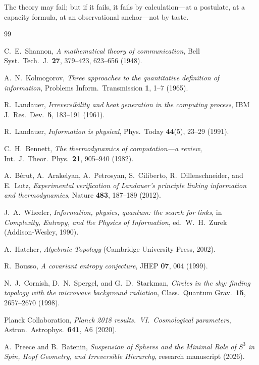 \documentclass[11pt,a4paper]{article}
\theoremstyle{definition}
\theoremstyle{remark}
\newcommand{\Sthree}{S^{3}}
\begin{document}
The theory may fail; but if it fails, it fails by calculation---at a postulate, at a capacity
formula, at an observational anchor---not by taste.

\begin{thebibliography}{99}

C.~E.~Shannon, \emph{A mathematical theory of communication},
Bell Syst.\ Tech.\ J.\ \textbf{27}, 379--423, 623--656 (1948).

A.~N.~Kolmogorov, \emph{Three approaches to the quantitative definition of information},
Problems Inform.\ Transmission \textbf{1}, 1--7 (1965).

R.~Landauer, \emph{Irreversibility and heat generation in the computing process},
IBM J.\ Res.\ Dev.\ \textbf{5}, 183--191 (1961).

R.~Landauer, \emph{Information is physical}, Phys.\ Today \textbf{44}(5), 23--29 (1991).

C.~H.~Bennett, \emph{The thermodynamics of computation---a review},
Int.\ J.\ Theor.\ Phys.\ \textbf{21}, 905--940 (1982).

A.~B\'erut, A.~Arakelyan, A.~Petrosyan, S.~Ciliberto, R.~Dillenschneider, and E.~Lutz,
\emph{Experimental verification of Landauer's principle linking information and thermodynamics},
Nature \textbf{483}, 187--189 (2012).

J.~A.~Wheeler, \emph{Information, physics, quantum: the search for links}, in
\emph{Complexity, Entropy, and the Physics of Information}, ed.\ W.~H.~Zurek
(Addison-Wesley, 1990).

A.~Hatcher, \emph{Algebraic Topology} (Cambridge University Press, 2002).

R.~Bousso, \emph{A covariant entropy conjecture}, JHEP \textbf{07}, 004 (1999).

N.~J.~Cornish, D.~N.~Spergel, and G.~D.~Starkman,
\emph{Circles in the sky: finding topology with the microwave background radiation},
Class.\ Quantum Grav.\ \textbf{15}, 2657--2670 (1998).

Planck Collaboration, \emph{Planck 2018 results.\ VI.\ Cosmological parameters},
Astron.\ Astrophys.\ \textbf{641}, A6 (2020).

A.~Preece and B.~Batenin, \emph{Suspension of Spheres and the Minimal Role of $\Sthree$ in
Spin, Hopf Geometry, and Irreversible Hierarchy}, research manuscript (2026).


\end{thebibliography}
\end{document}
